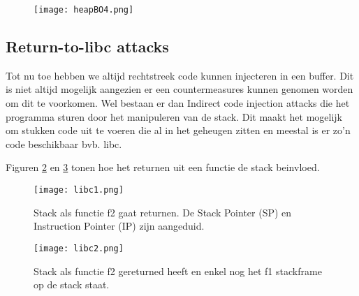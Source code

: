 \documentclass[../main.tex]{subfiles}
\begin{document}
\begin{figure}
\centering
\texttt{[image: heapBO4.png]}
\caption{}
\label{f:heapBO4}
\end{figure}
\subsection{Return-to-libc attacks}
Tot nu toe hebben we altijd rechtstreek code kunnen injecteren in een buffer.
Dit is niet altijd mogelijk aangezien er een countermeasures kunnen genomen worden om dit te voorkomen.
Wel bestaan er dan Indirect code injection attacks die het programma sturen door het manipuleren van de stack.
Dit maakt het mogelijk om stukken code uit te voeren die al in het geheugen zitten en meestal is er zo'n code beschikbaar bvb. libc.

Figuren \ref{f:libc1} en \ref{f:libc2} tonen hoe het returnen uit een functie de stack beinvloed.
\begin{figure}
\centering
\texttt{[image: libc1.png]}
\caption{Stack als functie f2 gaat returnen. De Stack Pointer (SP) en Instruction Pointer (IP) zijn aangeduid.}
\label{f:libc1}
\end{figure}

\begin{figure}
\centering
\texttt{[image: libc2.png]}
\caption{Stack als functie f2 gereturned heeft en enkel nog het f1 stackframe op de stack staat.}
\label{f:libc2}
\end{figure}
\end{document}
